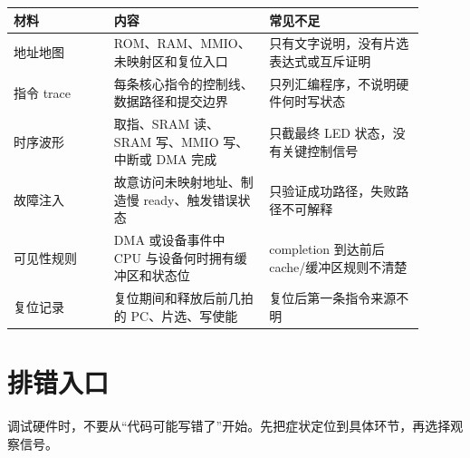 \begin{longtable}{L{0.22\linewidth}L{0.34\linewidth}L{0.34\linewidth}}
\toprule
材料 & 内容 & 常见不足 \\
\midrule
地址地图 & ROM、RAM、MMIO、未映射区和复位入口 & 只有文字说明，没有片选表达式或互斥证明 \\\tablerowrule
指令 trace & 每条核心指令的控制线、数据路径和提交边界 & 只列汇编程序，不说明硬件何时写状态 \\\tablerowrule
时序波形 & 取指、SRAM 读、SRAM 写、MMIO 写、中断或 DMA 完成 & 只截最终 LED 状态，没有关键控制信号 \\\tablerowrule
故障注入 & 故意访问未映射地址、制造慢 ready、触发错误状态 & 只验证成功路径，失败路径不可解释 \\\tablerowrule
可见性规则 & DMA 或设备事件中 CPU 与设备何时拥有缓冲区和状态位 & completion 到达前后 cache/缓冲区规则不清楚 \\\tablerowrule
复位记录 & 复位期间和释放后前几拍的 PC、片选、写使能 & 复位后第一条指令来源不明 \\
\bottomrule
\end{longtable}

\section*{排错入口}

调试硬件时，不要从“代码可能写错了”开始。先把症状定位到具体环节，再选择观察信号。

